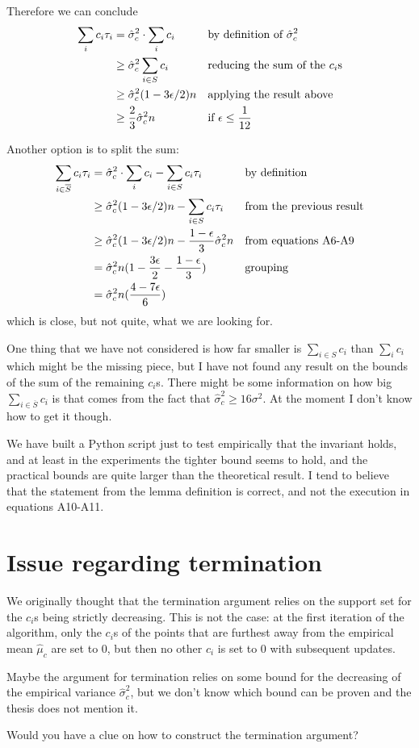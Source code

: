 \documentclass[11pt]{article}
\begin{document}
Therefore we can conclude
\begin{align*}
\sum_i c_i \tau_i &= \hat\sigma_c^2 \cdot \sum_i c_i &&\text{by definition of }\hat\sigma_c^2\\
&\ge \hat\sigma_c^2 \sum_{i \in S} c_i &&\text{reducing the sum of the $c_i$s}\\
&\ge \hat\sigma_c^2 (1-3\epsilon/2)n &&\text{applying the result above}\\
&\ge {2\over 3} \hat\sigma_c^2 n &&\text{if }\epsilon \le {1\over12}
\end{align*}

Another option is to split the sum:
\begin{align*}
\sum_{i \in \overline S} c_i \tau_i &= \hat\sigma_c^2 \cdot \sum_i c_i - \sum_{i \in S} c_i \tau_i &&\text{by definition}\\
&\ge \hat\sigma_c^2(1-3\epsilon/2)n - \sum_{i\in S}c_i \tau_i&&\text{from the previous result}\\
&\ge \hat\sigma_c^2(1-3\epsilon/2)n - {1-\epsilon \over 3}\hat\sigma_c^2n &&\text{from equations A6-A9}\\
&= \hat\sigma_c^2n(1-{3\epsilon\over 2} - {1-\epsilon \over 3}) &&\text{grouping}\\
&= \hat\sigma_c^2n({4-7\epsilon \over 6})
\end{align*}
which is close, but not quite, what we are looking for.

One thing that we have not considered is how far smaller is \(\sum_{i\in S} c_i\) than \(\sum_i c_i\) which might be the missing piece, but I have not found any result on the bounds of the sum of the remaining \(c_i\)s.
There might be some information on how big \(\sum_{i \in \overline S} c_i\) is that comes from the fact that \(\hat\sigma_c^2 \ge 16 \sigma^2\).
At the moment I don't know how to get it though.

We have built a Python script just to test empirically that the invariant holds, and at least in the experiments the tighter bound seems to hold, and the practical bounds are quite larger than the theoretical result. I tend to believe that the statement from the lemma definition is correct, and not the execution in equations A10-A11.

\section{Issue regarding termination}
We originally thought that the termination argument relies on the support set for the $c_i$s being strictly decreasing.
This is not the case: at the first iteration of the algorithm, only the $c_i$s of the points that are furthest away from the empirical mean $\hat\mu_c$ are set to 0, but then no other $c_i$ is set to 0 with subsequent updates.

Maybe the argument for termination relies on some bound for the decreasing of the empirical variance $\hat\sigma_c^2$, but we don't know which bound can be proven and the thesis does not mention it.

Would you have a clue on how to construct the termination argument?
\end{document}
